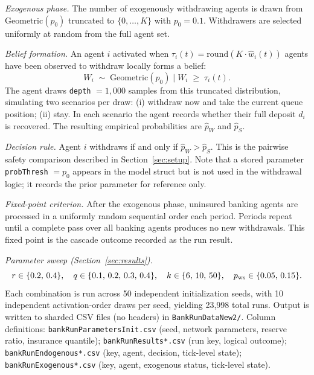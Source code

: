 \medskip

\noindent\textit{Exogenous phase.}\; The number of exogenously
withdrawing agents is drawn from
$\mathrm{Geometric}(p_0)$ truncated to $\{0,\ldots,K\}$ with
$p_0 = 0.1$. Withdrawers are selected uniformly at random from the
full agent set.

\medskip

\noindent\textit{Belief formation.}\; An agent $i$ activated when
$\tau_i(t) = \mathrm{round}(K \cdot \hat{w}_i(t))$ agents have
been observed to withdraw locally forms a belief:
\[
  W_i \;\sim\; \mathrm{Geometric}(p_0)
  \;\big|\; W_i \;\geq\; \tau_i(t).
\]
The agent draws \texttt{depth} $= 1{,}000$ samples from this
truncated distribution, simulating two scenarios per draw: (i)
withdraw now and take the current queue position; (ii) stay. In
each scenario the agent records whether their full deposit $d_i$
is recovered. The resulting empirical probabilities are $\hat{p}_W$
and $\hat{p}_S$.

\medskip

\noindent\textit{Decision rule.}\; Agent $i$ withdraws if and only
if $\hat{p}_W > \hat{p}_S$. This is the pairwise safety comparison
described in Section~\ref{sec:setup}. Note that a stored parameter
\texttt{probThresh} $= p_0$ appears in the model struct but is not
used in the withdrawal logic; it records the prior parameter for
reference only.

\medskip

\noindent\textit{Fixed-point criterion.}\; After the exogenous
phase, uninsured banking agents are processed in a uniformly random
sequential order each period. Periods repeat until a complete pass
over all banking agents produces no new withdrawals. This fixed
point is the cascade outcome recorded as the run result.

\medskip

\noindent\textit{Parameter sweep (Section~\ref{sec:results}).}\;
\[
  r \in \{0.2,\, 0.4\},\quad
  q \in \{0.1,\, 0.2,\, 0.3,\, 0.4\},\quad
  k \in \{6,\, 10,\, 50\},\quad
  p_{\rm ws} \in \{0.05,\, 0.15\}.
\]
Each combination is run across 50 independent initialization seeds,
with 10 independent activation-order draws per seed, yielding
23{,}998 total runs. Output is written to sharded CSV files
(no headers) in \texttt{BankRunDataNew2/}. Column definitions:
\texttt{bankRunParametersInit.csv} (seed, network parameters,
reserve ratio, insurance quantile); \texttt{bankRunResults*.csv}
(run key, logical outcome); \texttt{bankRunEndogenous*.csv} (key,
agent, decision, tick-level state); \texttt{bankRunExogenous*.csv}
(key, agent, exogenous status, tick-level state).

